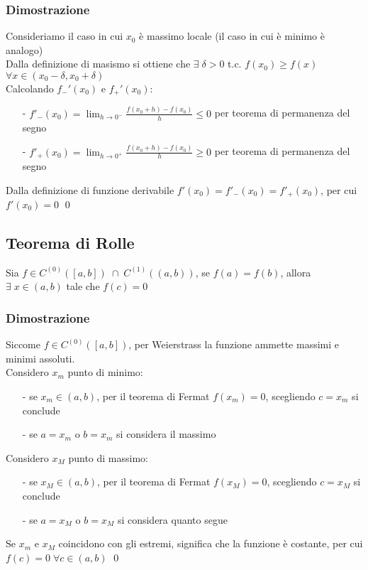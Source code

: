 \documentclass[a4paper]{article}
\newcommand\cont[2]{C^{(#1)} \left({#2}\right)}
\begin{document}
\subsubsection*{Dimostrazione}
Consideriamo il caso in cui \(x_0\) è massimo locale (il caso in cui è minimo è analogo) \\
Dalla definizione di masismo si ottiene che \(\exists \; \delta > 0\) t.c. \(f(x_0) \geq f(x)\) \(\forall x \in \left(x_0 - \delta, x_0 + \delta\right)\) \\
Calcolando \(f_-'(x_0)\) e \(f_+'(x_0)\):
\begin{itemize} [topsep=3pt, itemsep=0pt]
	\item[-] \(\displaystyle f'_-(x_0) = \lim_{h \to 0^-} \frac{f(x_0 + h) - f(x_0)}{h} \leq 0\) per teorema di permanenza del segno
	\item[-] \(\displaystyle f'_+(x_0) = \lim_{h \to 0^+} \frac{f(x_0 + h) - f(x_0)}{h} \geq 0\) per teorema di permanenza del segno
\end{itemize}
Dalla definizione di funzione derivabile \(f'(x_0) = f'_-(x_0) = f'_+(x_0)\), per cui \(f'(x_0) = 0\)
\qed

\subsection{Teorema di Rolle}
Sia \(f \in \cont{0}{\left[a, b\right]} \; \cap \; \cont{1}{\left(a, b\right)}\), se \(f(a) = f(b)\), allora \(\exists \; x \in \left(a, b\right)\)
tale che \(f(c) = 0\)

\subsubsection*{Dimostrazione}
Siccome \(f \in \cont{0}{\left[a, b\right]}\), per Weierstrass la funzione ammette massimi e minimi assoluti. \\
Considero \(x_m\) punto di minimo:
\begin{itemize} [topsep=3pt, itemsep=0pt]
	\item[-] se \(x_m \in \left(a, b\right)\), per il teorema di Fermat \(f(x_m) = 0\), scegliendo \(c = x_m\) si conclude
	\item[-] se \(a = x_m\) o \(b = x_m\) si considera il massimo
\end{itemize}
Considero \(x_M\) punto di massimo:
\begin{itemize} [topsep=3pt, itemsep=0pt]
	\item[-] se \(x_M \in \left(a, b\right)\), per il teorema di Fermat \(f(x_M) = 0\), scegliendo \(c = x_M\) si conclude
	\item[-] se \(a = x_M\) o \(b = x_M\) si considera quanto segue
\end{itemize}
Se \(x_m\) e \(x_M\) coincidono con gli estremi, significa che la funzione è costante, per cui \(f(c) = 0 \; \forall c \in \left(a, b\right)\)
\qed
\end{document}
